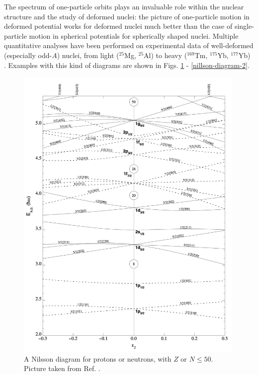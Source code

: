 The spectrum of one-particle orbits plays an invaluable role within the nuclear structure and the study of deformed nuclei: the picture of one-particle motion in deformed potential works for deformed nuclei much better than the case of single-particle motion in spherical potentials for spherically shaped nuclei. Multiple quantitative analyses have been performed on experimental data of well-deformed (especially odd-$A$) nuclei, from light ($^{25}$Mg, $^{25}$Al) to heavy ($^{169}$Tm, $^{175}$Yb, $^{177}$Yb) \cite{hamamoto2016interplay}. Examples with this kind of diagrams are shown in Figs. \ref{nillson-diagram} - \ref{nillson-diagram-2}. 
\begin{figure}
    \centering
    \includegraphics[width=0.99\textwidth]{Chapters/Figures/nillson_diagram.png}
    \caption{A Nilsson diagram for protons or neutrons, with $Z$ or $N\leq50$. Picture taken from Ref. \cite{ragnarsson2005shapes}.}
    \label{nillson-diagram}
\end{figure}
